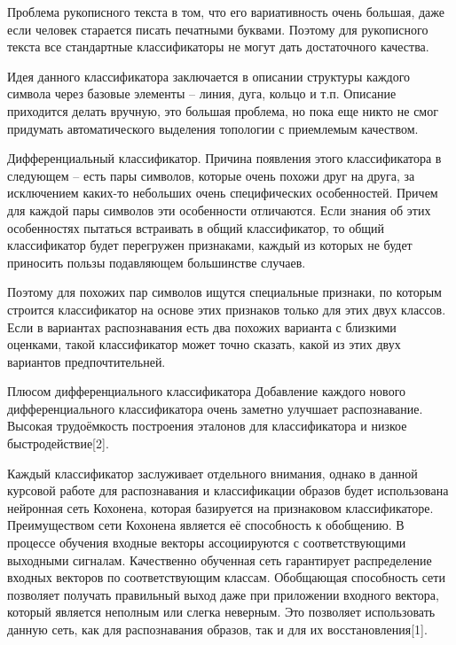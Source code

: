 \documentclass[14pt,a4paper]{extreport}
\begin{document}
\hspace{4ex} Проблема рукописного текста в том, что его вариативность очень большая, даже если человек старается писать печатными буквами. Поэтому для рукописного текста все стандартные классификаторы не могут дать достаточного качества.\ 

\hspace{4ex} Идея данного классификатора заключается в описании структуры каждого символа через базовые элементы – линия, дуга, кольцо и т.п. Описание приходится делать вручную, это большая проблема, но пока еще никто не смог придумать автоматического выделения топологии с приемлемым качеством.

\hspace{4ex} Дифференциальный классификатор. Причина появления этого классификатора в следующем – есть пары символов, которые очень похожи друг на друга, за исключением каких-то небольших очень специфических особенностей. Причем для каждой пары символов эти особенности отличаются. Если знания об этих особенностях пытаться встраивать в общий классификатор, то общий классификатор будет перегружен признаками, каждый из которых не будет приносить пользы подавляющем большинстве случаев.\

\hspace{4ex} Поэтому для похожих пар символов ищутся специальные признаки, по которым строится классификатор на основе этих признаков только для этих двух классов. Если в вариантах распознавания есть два похожих варианта с близкими оценками, такой классификатор может точно сказать, какой из этих двух вариантов предпочтительней.\

\hspace{4ex} Плюсом дифференциального классификатора Добавление каждого нового дифференциального классификатора очень заметно улучшает распознавание. Высокая трудоёмкость построения эталонов для классификатора и низкое быстродействие[2].\

\hspace{4ex} Каждый классификатор заслуживает отдельного внимания, однако в данной курсовой работе для распознавания и классификации образов будет использована нейронная сеть Кохонена, которая базируется на признаковом классификаторе. Преимуществом сети Кохонена является её способность к обобщению. В процессе обучения входные векторы ассоциируются с соответствующими выходными сигналам. Качественно обученная сеть гарантирует распределение входных векторов по соответствующим классам. Обобщающая способность сети позволяет получать правильный выход даже при приложении входного вектора, который является неполным или слегка неверным. Это позволяет использовать данную сеть, как для распознавания образов, так и для их восстановления[1].\
\end{document}
